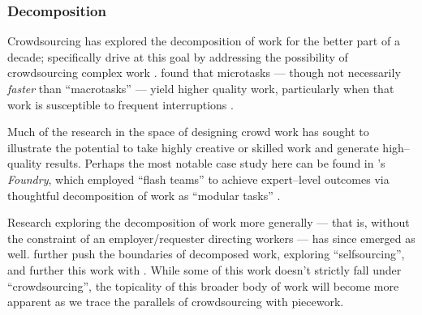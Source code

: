 \documentclass[trackingWork]{subfiles}
\begin{document}



\subsubsection{Decomposition}\label{sec:decomposition}
Crowdsourcing has explored the decomposition of work for the better part of a decade;
\citeauthor{crowdForgeKittur} specifically
drive at this goal by addressing the possibility of
crowdsourcing complex work
\cite{crowdForgeKittur}.
\citeauthor{cheng2015break} found that microtasks
--- though not necessarily \textit{faster} than ``macrotasks'' ---
yield higher quality work,
particularly when that work is susceptible to frequent interruptions
\cite{cheng2015break}.

Much of the research in the space of designing crowd work has
sought to illustrate the potential to take highly creative or skilled work
and generate high--quality results.
Perhaps the most notable case study here can be found in
\citeauthor{foundry}'s \textit{Foundry}, which employed
``flash teams'' to achieve expert--level outcomes via thoughtful
decomposition of work as ``modular tasks''
\cite{foundry}.

Research exploring the decomposition of work more generally
--- that is, without the constraint of an employer/requester directing workers ---
has since emerged as well.
\citeauthor{selfsourcingTeevan2014} further push the boundaries of decomposed work,
exploring ``selfsourcing'', and further this work with \citeauthor{selfsourcingTeevan2016}
\cite{selfsourcingTeevan2014,selfsourcingTeevan2016}.
While some of this work doesn't strictly fall under ``crowdsourcing'',
the topicality of this broader body of work will become more apparent
as we trace the parallels of crowdsourcing with piecework.
\end{document}
